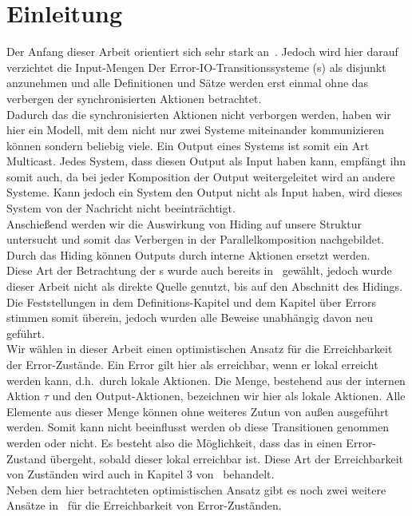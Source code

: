 \chapter{Einleitung}

Der Anfang dieser Arbeit orientiert sich sehr stark an~\cite{Vogler2014EIO}.
Jedoch wird hier darauf verzichtet die Input-Mengen Der
Error-IO-Transitionssysteme (\EIO{}s) als disjunkt anzunehmen und alle
Definitionen und Sätze werden erst einmal ohne das verbergen der
synchronisierten Aktionen betrachtet.\\
Dadurch das die synchronisierten Aktionen nicht verborgen werden, haben wir hier
ein Modell, mit dem nicht nur zwei Systeme miteinander kommunizieren können
sondern beliebig viele. Ein Output eines Systems ist somit ein Art Multicast.
Jedes System, dass diesen Output als Input haben kann, empfängt ihn somit auch,
da bei jeder Komposition der Output weitergeleitet wird an andere Systeme.
Kann jedoch ein System den Output nicht als Input haben, wird dieses System von
der Nachricht nicht beeinträchtigt.\\
Anschießend werden wir die Auswirkung von Hiding auf unsere Struktur
untersucht und somit das Verbergen in der Parallelkomposition nachgebildet.
Durch das Hiding können Outputs durch interne Aktionen ersetzt werden.\\
Diese Art der Betrachtung der
\EIO{}s wurde auch bereits in~\cite{Schlosser2012BA} gewählt, jedoch wurde
dieser Arbeit nicht als direkte Quelle genutzt, bis auf den Abschnitt des
Hidings. Die Feststellungen in dem Definitions-Kapitel und dem Kapitel über
Errors stimmen somit überein, jedoch wurden alle Beweise unabhängig davon neu
geführt.\\
Wir wählen in dieser Arbeit einen optimistischen Ansatz für die Erreichbarkeit
der Error-Zustände. Ein Error gilt hier als erreichbar, wenn er lokal erreicht
werden kann, d.h.\ durch lokale Aktionen. Die Menge, bestehend aus der internen
Aktion $\tau$ und den Output-Aktionen, bezeichnen wir hier als lokale Aktionen.
Alle Elemente aus dieser Menge können ohne weiteres Zutun von außen ausgeführt
werden. Somit kann nicht beeinflusst werden ob diese Transitionen genommen
werden oder nicht. Es besteht also die Möglichkeit, dass das \EIO{} in einen
Error-Zustand übergeht, sobald dieser lokal erreichbar ist. Diese Art der
Erreichbarkeit von Zuständen wird auch in Kapitel 3 von~\cite{Vogler2014EIO}
behandelt.\\
Neben dem hier betrachteten optimistischen Ansatz gibt es noch zwei weitere
Ansätze in~\cite{Vogler2014EIO} für die Erreichbarkeit von Error-Zuständen.
